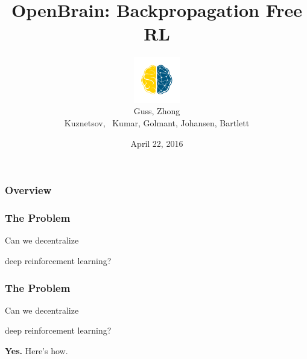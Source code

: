 \documentclass{beamer}
\title[OpenBrain]{OpenBrain: Backpropagation Free RL}
\author[Guss \& Zhong et. al]{\includegraphics[height=2cm,width=2cm]{BlueGold_fill_small.png}\\   Guss,  Zhong  \\ Kuznetsov,  \ Kumar,  Golmant, Johansen,  Bartlett}
\date{April 22, 2016} %
\numberwithin{equation}{subsection}
\numberwithin{theorem}{subsection}
\begin{document}
\begin{frame}
\titlepage
\end{frame}


\begin{frame}

\begin{center}
\Huge
\end{center}


\frametitle{Overview}
\tableofcontents
\end{frame}

\begin{frame}
\frametitle{The Problem}
    \Huge{\centerline{Can we decentralize }}
    \Huge{\centerline{deep reinforcement learning?}}
\end{frame}

\begin{frame}
\frametitle{The Problem}
    \Huge{\centerline{Can we decentralize }}
    \Huge{\centerline{deep reinforcement learning?}}
    \Huge{\centerline{\textbf{Yes.} Here's how. }}
\end{frame}


\end{document}
